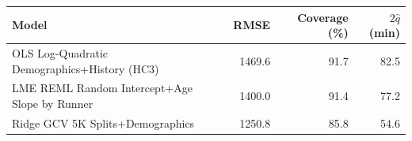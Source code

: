 \begin{tabular}{lrrr}
\hline
Model & RMSE & Coverage (\%) & $2\hat{q}$ (min) \\
\hline
OLS Log-Quadratic Demographics+History (HC3) & 1469.6 & 91.7 & 82.5 \\
LME REML Random Intercept+Age Slope by Runner & 1400.0 & 91.4 & 77.2 \\
Ridge GCV 5K Splits+Demographics & 1250.8 & 85.8 & 54.6 \\
\hline
\end{tabular}
